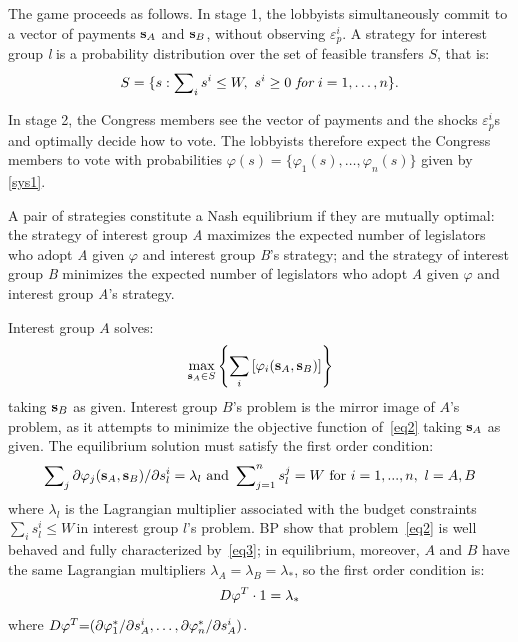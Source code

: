 \documentclass[nojss]{jss}
\begin{document}
The game proceeds as follows. In stage 1, the lobbyists simultaneously commit to a vector of payments ${\bf s}_{A}$ and ${\bf s}_{B}$, without observing $\varepsilon^{i}_{p}$. A strategy for interest group \textit{l} is a probability distribution over the set of feasible transfers $S$, that is: 
\[S=\{s:\sum\nolimits_{i}s^{i}\leq W,\text{ }s^{i}\geq 0\text{ {\it for} } i=1,\dots,n\}.\]

In stage 2, the Congress members see the vector of payments and the shocks $\varepsilon^{i}_{p}$s and optimally decide how to vote. The lobbyists therefore expect the Congress members to vote with probabilities $\varphi
(s)=\{\varphi _{1}(s),\dots,\varphi _{n}(s)\}$ given by \ref{sys1}.

A pair of strategies constitute a Nash equilibrium if they are mutually optimal: the strategy of interest group \textit{A} maximizes the expected number of legislators who adopt \textit{A} given $\varphi$ and interest group \textit{B}'s strategy; and the strategy of interest group \textit{B} minimizes the expected number of legislators who adopt \textit{A} given $\varphi$ and interest group \textit{A}'s strategy.

Interest group $A$ solves:
\begin{equation}
	\max_{{\bf s}_{A}\in S}\left\{ \sum_{i}\left[ \varphi _{i}({\bf s}_{A},{\bf s%
	}_{B})\right] \right\}  \label{eq2}
\end{equation}%
taking ${\bf s}_{B}$ as given. Interest group $B$'s problem is the
mirror image of $A$'s problem, as it attempts to minimize the objective
function of~\ref{eq2} taking ${\bf s}_{A}$ as given. The equilibrium
solution must satisfy the first order condition:
\begin{equation}
	\sum\nolimits_{j}\partial \varphi _{j}({\bf s}_{A},{\bf s}_{B})/\partial
	s_{l}^{i}=\lambda _{l}\text{ and }\sum\nolimits_{j=1}^{n}s_{l}^{j}=W\text{
		for }i=1,...,n,\text{ }l=A,B  \label{eq3}
\end{equation}
where $\lambda_{l}$ is the Lagrangian multiplier associated with the budget
constraints $\sum\nolimits_{i}s_{l}^{i}\leq W\,$in interest group $l$'s
problem. BP show that problem~\ref{eq2} is well behaved and fully characterized by~\ref{eq3}; in equilibrium, moreover, $A$ and $B$ have the same Lagrangian multipliers $\lambda_{A}=\lambda _{B}=\lambda _{\ast}$, so the first order condition is: 
\[
D{\bf \varphi }^{T}\cdot 1=\lambda _{\ast } 
\]%
where $D{\bf \varphi }^{T}{\bf =}(\partial \varphi _{1}^{\ast }/\partial
s_{A}^{i},\dots,\partial \varphi _{n}^{\ast }/\partial s_{A}^{i})$.
\end{document}
